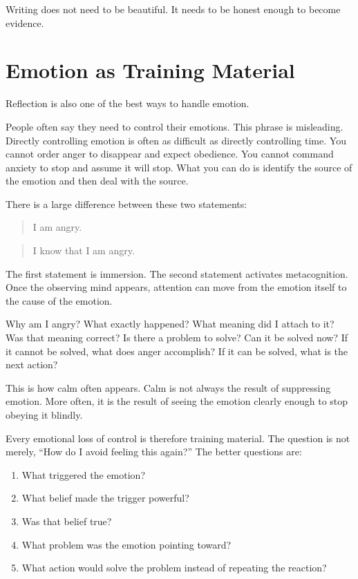 Writing does not need to be beautiful. It needs to be honest enough to become evidence.

\section*{Emotion as Training Material}

Reflection is also one of the best ways to handle emotion.

People often say they need to control their emotions. This phrase is misleading. Directly controlling emotion is often as difficult as directly controlling time. You cannot order anger to disappear and expect obedience. You cannot command anxiety to stop and assume it will stop. What you can do is identify the source of the emotion and then deal with the source.

There is a large difference between these two statements:

\begin{quote}
I am angry.
\end{quote}

\begin{quote}
I know that I am angry.
\end{quote}

The first statement is immersion. The second statement activates metacognition. Once the observing mind appears, attention can move from the emotion itself to the cause of the emotion.

Why am I angry? What exactly happened? What meaning did I attach to it? Was that meaning correct? Is there a problem to solve? Can it be solved now? If it cannot be solved, what does anger accomplish? If it can be solved, what is the next action?

This is how calm often appears. Calm is not always the result of suppressing emotion. More often, it is the result of seeing the emotion clearly enough to stop obeying it blindly.

Every emotional loss of control is therefore training material. The question is not merely, ``How do I avoid feeling this again?'' The better questions are:

\begin{enumerate}
\item What triggered the emotion?
\item What belief made the trigger powerful?
\item Was that belief true?
\item What problem was the emotion pointing toward?
\item What action would solve the problem instead of repeating the reaction?
\end{enumerate}

